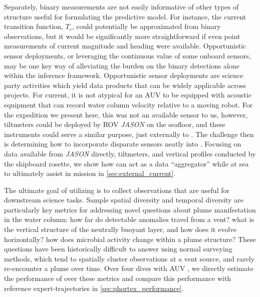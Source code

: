 Separately, binary measurements are not easily informative of other types of structure useful for formulating the \PHUMES predictive model. For instance, the current transition function, $T_c$, could potentially be approximated from binary observations, but it would be significantly more straightforward if even point measurements of current magnitude and heading were available. Opportunistic sensor deployments, or leveraging the continuous value of some onboard sensors, may be one key way of alleviating the burden on the binary detections alone within the \PHUMES inference framework. Opportunistic sensor deployments are science party activities which yield data products that can be widely applicable across projects. For current, it is not atypical for an AUV to be equipped with acoustic equipment that can record water column velocity relative to a moving robot. For the expedition we present here, this was not an available sensor to us, however, tiltmeters could be deployed by ROV \emph{JASON} on the seafloor, and these instruments could serve a similar purpose, just externally to \Sentry. The challenge then is determining how to incorporate disparate sensors neatly into \PHUMES. Focusing on data available from \emph{JASON} directly, tiltmeters, and vertical profiles conducted by the shipboard rosette, we show how \PHUMES can act as a data ``aggregator'' while at sea to ultimately assist in \Sentry mission in \cref{sec:external_current}.

The ultimate goal of utilizing \PHORTEX is to collect observations that are useful for downstream science tasks. Sample spatial diversity and temporal diversity are particularly key metrics for addressing novel questions about plume manifestation in the water column: how far do detectable anomalies travel from a vent? what is the vertical structure of the neutrally buoyant layer, and how does it evolve horizontally? how does microbial activity change within a plume structure? These questions have been historically difficult to answer using normal surveying methods, which tend to spatially cluster observations at a vent source, and rarely re-encounter a plume over time. Over four dives with AUV \Sentry, we directly estimate the performance of \PHORTEX over these metrics and compare this performance with reference expert-trajectories in \cref{sec:phortex_performance}.

